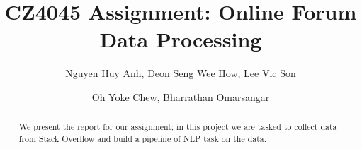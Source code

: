 \documentclass[sigconf]{acmart}
\begin{document}
\title{CZ4045 Assignment: Online Forum Data Processing}

\author{Nguyen Huy Anh, Deon Seng Wee How, Lee Vic Son}
\author{Oh Yoke Chew, Bharrathan Omarsangar}

\begin{abstract}
We present the report for our assignment; in this project we are tasked to
collect data from Stack Overflow and build a pipeline of NLP task on the data.
\end{abstract}

\renewcommand\footnotetextcopyrightpermission[1]{}
\pagestyle{plain}

\maketitle




 
\end{document}
